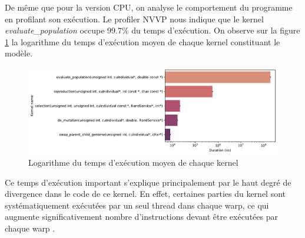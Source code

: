 \documentclass[a4paper, 10pt, twoside]{article}
\begin{document}
De même que pour la version CPU, on analyse le comportement du programme en profilant son exécution. Le profiler NVVP nous indique que le kernel \textit{evaluate\_population} occupe 99.7\% du temps d'exécution. On observe sur la figure \ref{fig:kernel/timings} la logarithme du temps d'exécution moyen de chaque kernel constituant le modèle.

\begin{figure}[htpb]
	\centering
	\includegraphics[width=0.7\linewidth]{img/kernel_timings.pdf}
	\caption{Logarithme du temps d'exécution moyen de chaque kernel}
	\label{fig:kernel/timings}
\end{figure}

Ce temps d'exécution important s'explique principalement par le haut degré de divergence dans le code de ce kernel. En effet, certaines parties du kernel sont systématiquement exécutées par un seul thread dans chaque warp, ce qui augmente significativement nombre d'instructions devant être exécutées par chaque warp \cite{nvidia/branching}.




\end{document}
